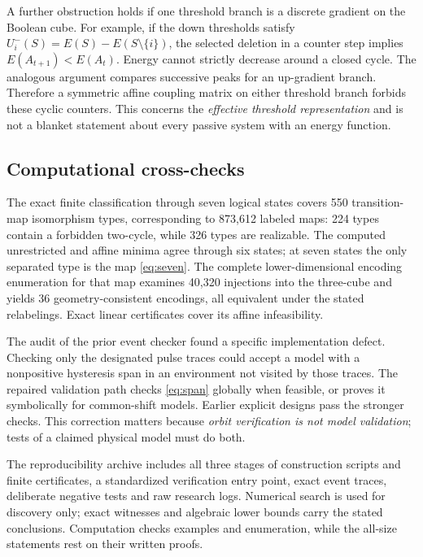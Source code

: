 \documentclass[12pt,letterpaper]{article}
\theoremstyle{definition}\newtheorem{definition}[theorem]{Definition}
\theoremstyle{remark}\newtheorem{remark}[theorem]{Remark}
\begin{document}
A further obstruction holds if one threshold branch is a discrete gradient on the Boolean cube. For example, if the down thresholds satisfy $U_i^-(S)=E(S)-E(S\setminus\{i\})$, the selected deletion in a counter step implies $E(A_{t+1})<E(A_t)$. Energy cannot strictly decrease around a closed cycle. The analogous argument compares successive peaks for an up-gradient branch. Therefore a symmetric affine coupling matrix on either threshold branch forbids these cyclic counters. This concerns the \emph{effective threshold representation} and is not a blanket statement about every passive system with an energy function.

\subsection{Computational cross-checks}
The exact finite classification through seven logical states covers 550 transition-map isomorphism types, corresponding to 873,612 labeled maps: 224 types contain a forbidden two-cycle, while 326 types are realizable. The computed unrestricted and affine minima agree through six states; at seven states the only separated type is the map \eqref{eq:seven}. The complete lower-dimensional encoding enumeration for that map examines 40,320 injections into the three-cube and yields 36 geometry-consistent encodings, all equivalent under the stated relabelings. Exact linear certificates cover its affine infeasibility.

The audit of the prior event checker found a specific implementation defect. Checking only the designated pulse traces could accept a model with a nonpositive hysteresis span in an environment not visited by those traces. The repaired validation path checks \eqref{eq:span} globally when feasible, or proves it symbolically for common-shift models. Earlier explicit designs pass the stronger checks. This correction matters because \emph{orbit verification is not model validation}; tests of a claimed physical model must do both.

The reproducibility archive includes all three stages of construction scripts and finite certificates, a standardized verification entry point, exact event traces, deliberate negative tests and raw research logs. Numerical search is used for discovery only; exact witnesses and algebraic lower bounds carry the stated conclusions. Computation checks examples and enumeration, while the all-size statements rest on their written proofs.
\end{document}

